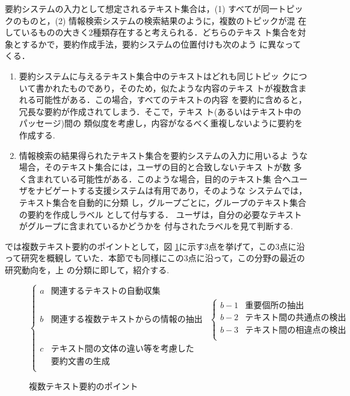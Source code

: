 要約システムの入力として想定されるテキスト集合は，(1) すべてが同一トピッ 
クのものと，(2) 情報検索システムの検索結果のように，複数のトピックが混
在しているものの大きく2種類存在すると考えられる．どちらのテキス
ト集合を対象とするかで，要約作成手法，要約システムの位置付けも次のよう
に異なってくる．
\begin{enumerate}
 \item 要約システムに与えるテキスト集合中のテキストはどれも同じトピッ
       クについて書かれたものであり，そのため，似たような内容のテキス
       トが複数含まれる可能性がある．この場合，すべてのテキストの内容
       を要約に含めると，冗長な要約が作成されてしまう．そこで，テキス
       ト(あるいはテキスト中のパッセージ)間の
       類似度を考慮し，内容がなるべく重複しないように要約を作成する.
 \item 情報検索の結果得られたテキスト集合を要約システムの入力に用いるよ
       うな場合，そのテキスト集合には，ユーザの目的と合致しないテキス
       トが数
       多く含まれている可能性がある．このような場合，目的のテキスト集
       合へユーザをナビゲートする支援システムは有用であり，そのような
       システムでは，テキスト集合を自動的に分類
       し，グループごとに，グループのテキスト集合の要約を作成しラベル
       として付与する．
       ユーザは，自分の必要なテキストがグループに含まれているかどうかを
       付与されたラベルを見て判断する.
\end{enumerate}

\cite{okumura:99:a}では複数テキスト要約のポイントとして，図
\ref{fig:multi-text-sum}に示す3点を挙げて，この3点に沿って研究を概観し
ていた．本節でも同様にこの3点に沿って，この分野の最近の研究動向を，上
の分類に即して，紹介する.
\begin{figure}[h]
\[
\left\{ 
 \begin{array}{lll}
  a & 関連するテキストの自動収集 &\\
  b & 関連する複数テキストからの情報の抽出 & 
\left\{ 
 \begin{array}{ll}
  b-1 & 重要個所の抽出\\
  b-2 & テキスト間の共通点の検出\\
  b-3 & テキスト間の相違点の検出\\
 \end{array}
\right.
\\
  c & テキスト間の文体の違い等を考慮した & \\
 & 要約文書の生成 & \\
 \end{array}
\right.
\]
\caption{複数テキスト要約のポイント\label{fig:multi-text-sum}}
\end{figure}


